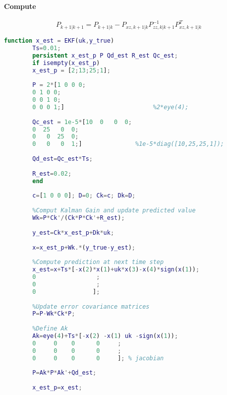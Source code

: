 	\paragraph{Compute}
	\[P_{k+1|k+1} = P_{k+1|k} - P_{xz,k+1|k}P^{-1}_{zz,k|k+1}P^T_{xz,k+1|k}\]
	
	
	
	
	
	
	
	
	\begin{lstlisting}[language=MATLAB]
		function x_est = EKF(uk,y_true)
		Ts=0.01;
		persistent x_est_p P Qd_est R_est Qc_est;
		if isempty(x_est_p)
		x_est_p = [2;13;25;1];
		
		P = 2*[1 0 0 0;
		0 1 0 0;
		0 0 1 0;
		0 0 0 1;]                         %2*eye(4);
		
		Qc_est = 1e-5*[10  0   0  0;
		0  25   0  0;
		0   0  25  0;
		0   0   0  1;]               %1e-5*diag([10,25,25,1]);
		
		Qd_est=Qc_est*Ts;
		
		R_est=0.02;
		end
	
		c=[1 0 0 0]; D=0; Ck=c;	Dk=D;
		
		%Comput Kalman Gain and update predicted value
		Wk=P*Ck'/(Ck*P*Ck'+R_est);
		
		y_est=Ck*x_est_p+Dk*uk;
		
		x=x_est_p+Wk.*(y_true-y_est);
		
		%Compute prediction at next time step
		x_est=x+Ts*[-x(2)*x(1)+uk*x(3)-x(4)*sign(x(1));
		0                 ;
		0                 ;
		0                ];
		
		%Update error covariance matrices
		P=P-Wk*Ck*P;
		
		%Define Ak
		Ak=eye(4)+Ts*[-x(2) -x(1) uk -sign(x(1));
		0     0    0      0     ;
		0     0    0      0     ;
		0     0    0      0     ]; % jacobian
		
		P=Ak*P*Ak'+Qd_est;
		
		x_est_p=x_est;
	\end{lstlisting}